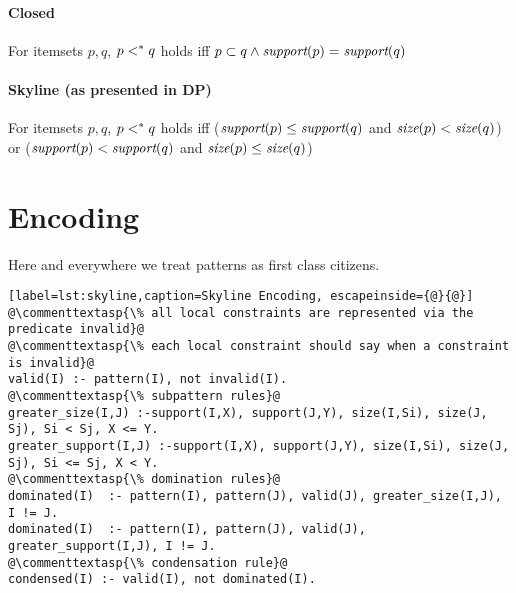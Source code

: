 \paragraph{Closed} For itemsets $p,q$, $p <^* q$ holds iff $p \subset q \wedge \textit{support}(p) = \textit{support}(q)$ 
\paragraph{Skyline (as presented in DP)} For itemsets $p,q$, $p <^* q$ holds iff ($\textit{support}(p) \leq \textit{support}(q)$ and $\textit{size}(p) < \textit{size}(q)$) or ($\textit{support}(p) < \textit{support}(q) $ and $\textit{size}(p) \leq \textit{size}(q)$)

\section{Encoding}
Here and everywhere we treat patterns as first class citizens. 

\begin{lstlisting}[label=lst:skyline,caption=Skyline Encoding, escapeinside={@}{@}]
@\commenttextasp{\% all local constraints are represented via the predicate invalid}@
@\commenttextasp{\% each local constraint should say when a constraint is invalid}@
valid(I) :- pattern(I), not invalid(I).
@\commenttextasp{\% subpattern rules}@
greater_size(I,J) :-support(I,X), support(J,Y), size(I,Si), size(J, Sj), Si < Sj, X <= Y. 
greater_support(I,J) :-support(I,X), support(J,Y), size(I,Si), size(J, Sj), Si <= Sj, X < Y. 
@\commenttextasp{\% domination rules}@
dominated(I)  :- pattern(I), pattern(J), valid(J), greater_size(I,J), I != J.
dominated(I)  :- pattern(I), pattern(J), valid(J), greater_support(I,J), I != J.
@\commenttextasp{\% condensation rule}@
condensed(I) :- valid(I), not dominated(I).
\end{lstlisting}



